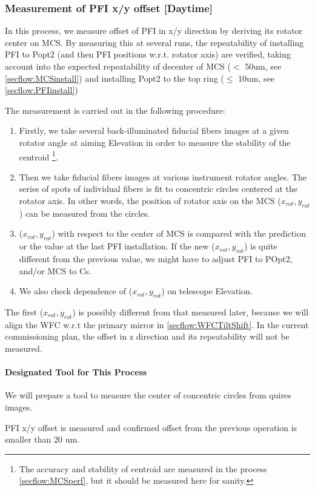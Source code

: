 \subsubsection{Measurement of PFI x/y offset [Daytime]}\label{secflow:PFIoffset}

In this process, we measure offset of PFI in x/y direction by deriving its rotator center on MCS.
By measuring this at several runs, the repeatability of installing PFI to Popt2 (and then PFI positions w.r.t. rotator axis) are verified, taking account into the expected repeatability of decenter of MCS ($<$ 50um, see \ref{secflow:MCSinstall}) and installing Popt2 to the top ring ($\leq$ 10um, see \ref{secflow:PFIinstall})

The measurement is carried out in the following procedure:
\begin{enumerate}
\item Firstly, we take several back-illuminated fiducial fibers images at a given rotator angle at aiming Elevation in order to measure the stability of the centroid \footnote{The accuracy and stability of centroid are measured in the process \ref{secflow:MCSperf}, but it should be measured here for sanity.}.
\item Then we take fiducial fibers images at various instrument rotator angles.
The series of spots of individual fibers is fit to concentric circles centered at the rotator axis.
In other words, the position of rotator axis on the MCS ($x_{rot}, y_{rot}$) can be measured from the circles. 
\item ($x_{rot}, y_{rot}$) with respect to the center of MCS is compared with the prediction or the value at the last PFI installation. 
If the new ($x_{rot}, y_{rot}$) is quite different from the previous value, we might have to adjust PFI to POpt2, and/or MCS to Cs.
\item We also check dependence of ($x_{rot}, y_{rot}$) on telescope Elevation.
\end{enumerate}

The first ($x_{rot}, y_{rot}$) is possibly different from that measured later, because we will align the WFC w.r.t the primary mirror in \ref{secflow:WFCTiltShift}.
In the current commissioning plan, the offset in z direction and its repeatability will not be measured.

\paragraph{Designated Tool for This Process}
We will prepare a tool to measure the center of concentric circles from quires images.

\begin{itembox}[l]{}
PFI x/y offset is measured and confirmed offset from the previous operation is smaller than 20 um. 

\end{itembox}